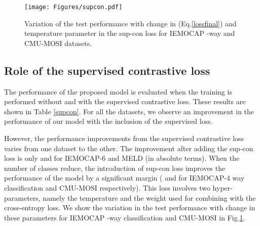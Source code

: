\documentclass[lettersize,journal]{IEEEtran}
\begin{document}
\begin{table}[t!]
\caption{The weighted F1 scores (in ) with and without the supervised contrastive loss. }
\label{supcon}
\begin{center}
\end{center}
\end{table}
\begin{figure}[t!]
    \centering
    \texttt{[image: Figures/supcon.pdf]}
    \caption{Variation of the test performance with change in  (Eq.\ref{lossfinal}) and temperature parameter in the sup-con loss for IEMOCAP -way and CMU-MOSI datasets.}
    \label{fig:supcon}
\end{figure}
\subsection{Role of the supervised contrastive loss}
The performance of the proposed model is evaluated when the training is performed without and with the supervised contrastive loss. These results are shown in Table \ref{supcon}. For all the datasets, we observe an improvement in the performance of our model with the inclusion of the supervised loss.

However, the performance improvements from   the supervised contrastive loss  varies from one dataset to the other.  
The improvement after adding  the sup-con loss is only  and  for IEMOCAP-6 and MELD (in absolute terms). When the number of classes reduce, the introduction of sup-con loss improves the performance of the model by a significant margin ( and  for IEMOCAP-4 way classification and CMU-MOSI respectively). 
This loss involves two hyper-parameters, namely the temperature and the weight used for combining with the cross-entropy loss.  We show the variation in the test performance with change in these parameters for IEMOCAP -way classification and CMU-MOSI in Fig.\ref{fig:supcon}.
\end{document}
